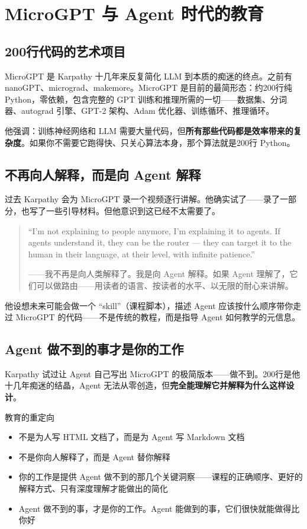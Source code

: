 \documentclass[a4paper]{article}
\begin{document}
\section{MicroGPT 与 Agent 时代的教育}

\subsection{200行代码的艺术项目}

MicroGPT 是 Karpathy 十几年来反复简化 LLM 到本质的痴迷的终点。之前有 nanoGPT、micrograd、makemore。MicroGPT 是目前的最简形态：约200行纯 Python，零依赖，包含完整的 GPT 训练和推理所需的一切——数据集、分词器、autograd 引擎、GPT-2 架构、Adam 优化器、训练循环、推理循环。

他强调：训练神经网络和 LLM 需要大量代码，但\textbf{所有那些代码都是效率带来的复杂度}。如果你不需要它跑得快、只关心算法本身，那个算法就是200行 Python。

\subsection{不再向人解释，而是向 Agent 解释}

过去 Karpathy 会为 MicroGPT 录一个视频逐行讲解。他确实试了——录了一部分，也写了一些引导材料。但他意识到这已经不太需要了。

\begin{quote}
``I'm not explaining to people anymore, I'm explaining it to agents. If agents understand it, they can be the router — they can target it to the human in their language, at their level, with infinite patience.''

——我不再是向人类解释了。我是向 Agent 解释。如果 Agent 理解了，它们可以做路由——用读者的语言、按读者的水平、以无限的耐心来讲解。
\end{quote}

他设想未来可能会做一个 ``skill''（课程脚本），描述 Agent 应该按什么顺序带你走过 MicroGPT 的代码——不是传统的教程，而是指导 Agent 如何教学的元信息。

\subsection{Agent 做不到的事才是你的工作}

Karpathy 试过让 Agent 自己写出 MicroGPT 的极简版本——做不到。200行是他十几年痴迷的结晶，Agent 无法从零创造，但\textbf{完全能理解它并解释为什么这样设计}。

\begin{importantbox}{教育的重定向}
\begin{itemize}
    \item 不是为人写 HTML 文档了，而是为 Agent 写 Markdown 文档
    \item 不是你向人解释了，而是 Agent 替你解释
    \item 你的工作是提供 Agent 做不到的那几个关键洞察——课程的正确顺序、更好的解释方式、只有深度理解才能做出的简化
    \item Agent 做不到的事，才是你的工作。Agent 能做到的事，它们很快就能做得比你好
\end{itemize}
\end{importantbox}
\end{document}
